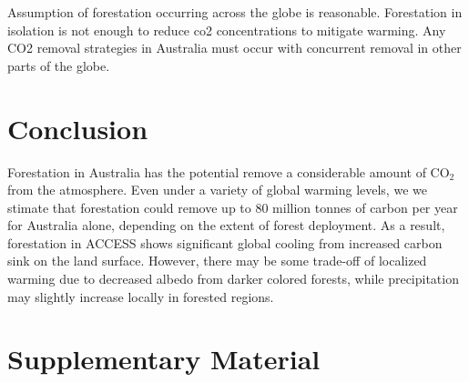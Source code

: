 \documentclass[]{article}
\begin{document}
Assumption of forestation occurring across the globe is reasonable.
Forestation in isolation is not enough to reduce co2 concentrations to mitigate warming.
Any CO2 removal strategies in Australia must occur with concurrent removal in other parts of the globe.

\section{Conclusion}

Forestation in Australia has the potential remove a considerable amount of CO$_2$ from the atmosphere.
Even under a variety of global warming levels, we we stimate that forestation could remove up to 80 million tonnes of carbon per year for Australia alone, depending on the extent of forest deployment.
As a result, forestation in ACCESS shows significant global cooling from increased carbon sink on the land surface.
However, there may be some trade-off of localized warming due to decreased albedo from darker colored forests, while precipitation may slightly increase locally in forested regions.

\printbibliography

\section{Supplementary Material}
\setcounter{figure}{0}
\end{document}

